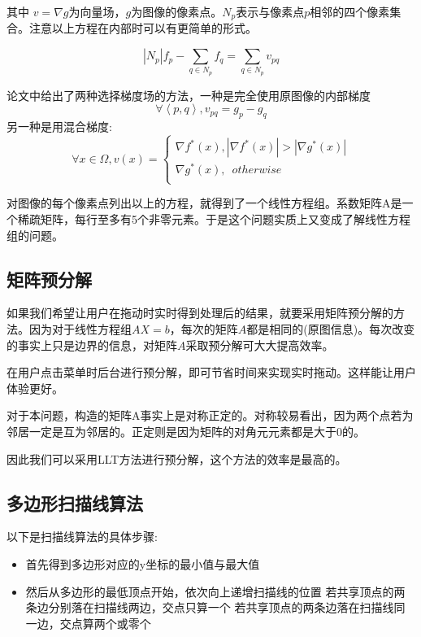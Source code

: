 \documentclass{article}
\begin{document}
	 其中 $v=\nabla g$为向量场，$g$为图像的像素点。$N_p$表示与像素点$p$相邻的四个像素集合。注意以上方程在内部时可以有更简单的形式。
	 
	  $$  \left\vert N_p \right\vert f_p - \sum\limits_{q\in N_p }f_q =  \sum\limits_{q\in N_p}v_{pq}$$
	  
	  论文\cite{PIE}中给出了两种选择梯度场的方法，一种是完全使用原图像的内部梯度
	  $$\forall \left< p, q \right>,v_{pq}=g_p-g_q$$
	  另一种是用混合梯度:
	 	$$   \forall x\in \Omega,v(x)=\left\{ 
	 \begin{array}{lc}
	 	\nabla f^{\ast}(x),\left\vert \nabla f^{\ast}(x) \right\vert > \left\vert \nabla g^{\ast}(x) \right\vert    \\
	 	\nabla g^{\ast}(x), \enspace otherwise    \\
	 \end{array}
	 \right.$$
	 
	 对图像的每个像素点列出以上的方程，就得到了一个线性方程组。系数矩阵A是一个稀疏矩阵，每行至多有5个非零元素。于是这个问题实质上又变成了解线性方程组的问题。
	
	
	\subsection{矩阵预分解}
	
	如果我们希望让用户在拖动时实时得到处理后的结果，就要采用矩阵预分解的方法。因为对于线性方程组$AX=b$，每次的矩阵$A$都是相同的(原图信息)。每次改变的事实上只是边界的信息，对矩阵$A$采取预分解可大大提高效率。
	
	在用户点击菜单时后台进行预分解，即可节省时间来实现实时拖动。这样能让用户体验更好。
	
	对于本问题，构造的矩阵A事实上是对称正定的。对称较易看出，因为两个点若为邻居一定是互为邻居的。正定则是因为矩阵的对角元元素都是大于0的。
	
	因此我们可以采用LLT方法进行预分解，这个方法的效率是最高的。
	
	\subsection{多边形扫描线算法}
	以下是扫描线算法的具体步骤:
	
	\begin{itemize}
	\item 首先得到多边形对应的y坐标的最小值与最大值
	\end{itemize}

	\begin{itemize}
	\item 然后从多边形的最低顶点开始，依次向上递增扫描线的位置
	 \subitem 若共享顶点的两条边分别落在扫描线两边，交点只算一个
	\subitem 若共享顶点的两条边落在扫描线同一边，交点算两个或零个
    \end{itemize}
\end{document}
